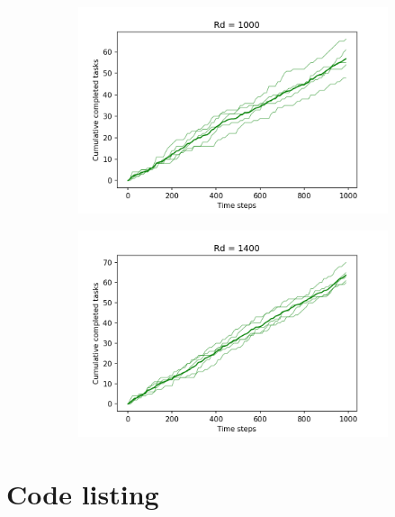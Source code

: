 \documentclass[11pt]{article}
\begin{document}
\begin{figure}[ht]
    \begin{subfigure}{.5\textwidth}
      \centering
      \includegraphics[width=\linewidth]{figures/Rd_1000.png}
    \end{subfigure}
    \begin{subfigure}{.5\textwidth}
      \centering
      \includegraphics[width=\linewidth]{figures/Rd_1400.png}
    \end{subfigure}
\end{figure}

\pagebreak
\section{Code listing}
\label{app:code}


\end{document}
